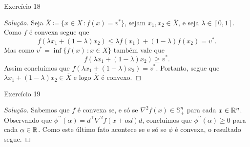 \documentclass[12pt,twoside,a4paper]{article}
\begin{document}
\begin{problema}
Exercício 18
\end{problema}
\begin{proof}[Solução]
  Seja \(\overline{X}\coloneqq\{x\in X\,\colon f(x)=v^\ast\}\), sejam
  \(x_1,x_2\in\overline{X}\), e seja \(\lambda\in [0,1]\). Como \(f\)
  é convexa segue que \[f(\lambda x_1+ (1-\lambda)x_2)\leq\lambda
    f(x_1)+(1-\lambda)f(x_2)=v^\ast.\]
  Mas como \(v^\ast=\inf\{f(x)\,\colon x\in X\}\) também vale que
  \[f(\lambda x_1+ (1-\lambda)x_2)\geq v^\ast.\]
  Assim concluímos que \(f(\lambda x_1+ (1-\lambda)x_2)= v^\ast.\) Portanto,
  segue que \(\lambda x_1 + (1-\lambda)x_2\in\overline{X}\) e logo
  \(\overline{X}\) é convexo.
\end{proof}

\begin{problema}\label{phiconv}
 Exercício 19
\end{problema}
\begin{proof}[Solução]
  Sabemos que \(f\) é convexa se, e só se
  \(\nabla^2f(x)\in\mathbb{S}^n_+\) para cada \(x\in\mathbb{R}^n\). Observando
  que \(\phi^{\prime\prime}(\alpha)=d^\top\nabla^2f(x+\alpha d) d\),
  concluímos que \(\phi^{\prime\prime}(\alpha)\geq 0\) para cada
  \(\alpha\in\mathbb{R}\). Como este último fato acontece se e só se \(\phi\)
  é convexa, o resultado segue.
\end{proof}
\end{document}
